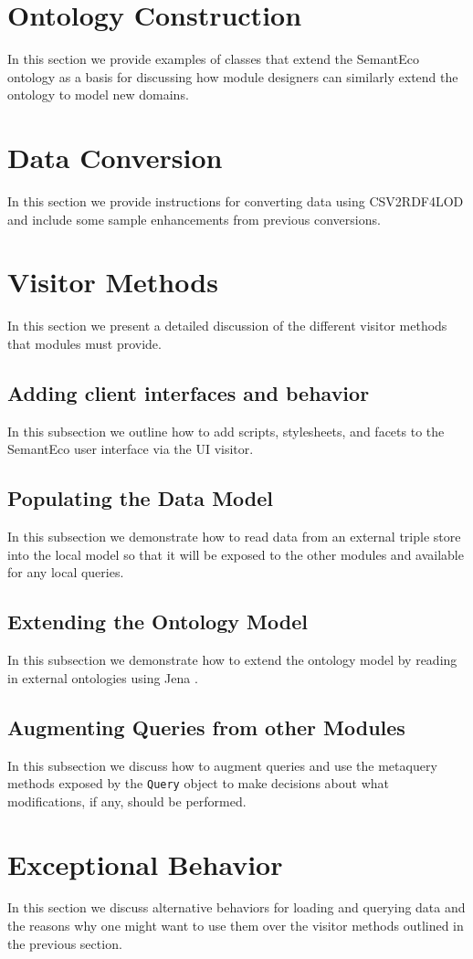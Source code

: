 \documentclass[letterpaper]{report}
\begin{document}
\section{Ontology Construction}
In this section we provide examples of classes that extend the SemantEco ontology as a basis for discussing how module designers can similarly extend the ontology to model new domains.
\section{Data Conversion}
In this section we provide instructions for converting data using CSV2RDF4LOD \cite{lebo2011producing} and include some sample enhancements from previous conversions.
\section{Visitor Methods}
\label{visitors}
In this section we present a detailed discussion of the different visitor methods that modules must provide.
\subsection{Adding client interfaces and behavior}
In this subsection we outline how to add scripts, stylesheets, and facets to the SemantEco user interface via the UI visitor.
\subsection{Populating the Data Model}
In this subsection we demonstrate how to read data from an external triple store into the local model so that it will be exposed to the other modules and available for any local queries.
\subsection{Extending the Ontology Model}
In this subsection we demonstrate how to extend the ontology model by reading in external ontologies using Jena \cite{Jena}.
\subsection{Augmenting Queries from other Modules}
In this subsection we discuss how to augment queries and use the metaquery methods exposed by the \texttt{Query} object to make decisions about what modifications, if any, should be performed.
\section{Exceptional Behavior}
In this section we discuss alternative behaviors for loading and querying data and the reasons why one might want to use them over the visitor methods outlined in the previous section.
\end{document}
